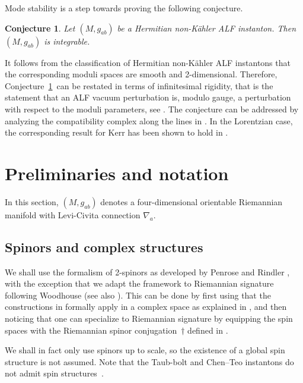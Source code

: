 \documentclass[pdftex]{sigma}
\numberwithin{equation}{section}
\newtheorem{Conjecture}[Theorem]{Conjecture}
 { \theoremstyle{definition}
\newtheorem{Definition}[Theorem]{Definition}
\newtheorem{Note}[Theorem]{Note}
\newtheorem{Example}[Theorem]{Example}
\newtheorem{Remark}[Theorem]{Remark} }
\begin{document}
Mode stability is a step towards proving the following conjecture.
\begin{Conjecture} \label{conj:integ}
Let $(M, g_{ab})$ be a Hermitian non-K\"ahler ALF instanton. Then $(M,g_{ab})$ is integrable.
\end{Conjecture}

\begin{Remark}%
It follows from the classification of Hermitian non-K\"ahler ALF instantons that the corresponding moduli spaces are smooth and 2-dimensional. Therefore, Conjecture~\ref{conj:integ}~can be restated in terms of infinitesimal rigidity, that is the statement that an ALF vacuum perturbation is, modulo gauge, a perturbation with respect to the moduli parameters, see \cite{2024CQGra..41h5004N}.
The conjecture can be addressed by analyzing the compatibility complex along the lines in \cite{AABKW}.
In the Lorentzian case, the corresponding result for Kerr has been shown to hold in \cite{2022arXiv220712952A}.
\end{Remark}




\section{Preliminaries and notation} \label{sec:preliminaries}

In this section, $(M,g_{ab})$ denotes a four-dimensional orientable Riemannian manifold with Levi-Civita connection $\nabla_{a}$.

\subsection{Spinors and complex structures} \label{sec:spinors}
We shall use the formalism of 2-spinors as developed by Penrose and Rindler \cite{PR:I, PR:II}, with the exception that we adapt the framework to Riemannian signature following Woodhouse \cite{Woodhouse_1985} (see also \cite{1994GReGr..26..979G}).
This can be done by first using that the constructions in \cite{PR:I, PR:II} formally apply in a complex space as explained in \cite[Section 6.9]{PR:II}, and then noticing that one can specialize to Riemannian signature by equipping the spin spaces with the Riemannian spinor conjugation~$\dagger$ defined in \cite[equation~(2.5)]{Woodhouse_1985}.

We shall in fact only use spinors up to scale, so the existence of a global spin structure is not assumed. Note that the Taub-bolt and Chen--Teo instantons do not admit spin structures~\mbox{\cite{2011PhLB..703..359C, 1978PhLB...78..249P}}.
\end{document}
